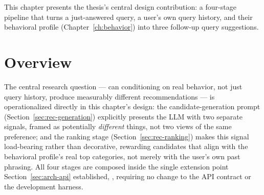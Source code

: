 This chapter presents the thesis's central design contribution: a four-stage pipeline that turns a
just-answered query, a user's own query history, and their behavioral profile
(Chapter~\ref{ch:behavior}) into three follow-up query suggestions.

\section{Overview}
\label{sec:rec-overview}

The central research question --- can conditioning on real behavior, not just query history,
produce measurably different recommendations --- is operationalized directly in this chapter's
design: the candidate-generation prompt (Section~\ref{sec:rec-generation}) explicitly presents the
LLM with two separate signals, framed as potentially \emph{different} things, not two views of the
same preference; and the ranking stage (Section~\ref{sec:rec-ranking}) makes this signal
load-bearing rather than decorative, rewarding candidates that align with the behavioral profile's
real top categories, not merely with the user's own past phrasing. All four stages are composed
inside the single extension point Section~\ref{sec:arch-api} established,
, requiring no change to the API contract or the development harness.

